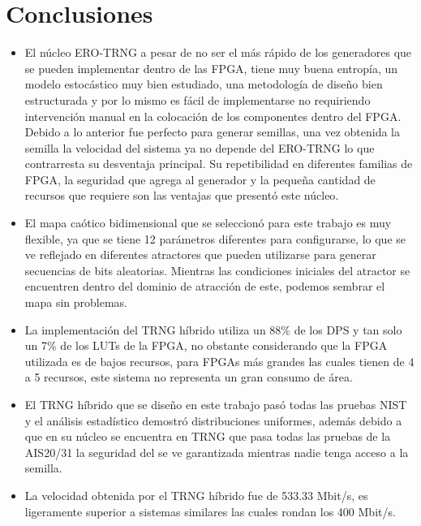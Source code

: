 \chapter{Conclusiones}

    \begin{itemize}
        \item El núcleo ERO-TRNG a pesar de no ser el más rápido de los generadores que se pueden implementar dentro de las FPGA, tiene muy buena entropía, un modelo estocástico muy bien estudiado, una metodología de diseño bien estructurada y por lo mismo es fácil de implementarse no requiriendo intervención manual en la colocación de los componentes dentro del FPGA. Debido a lo anterior fue perfecto para generar semillas, una vez obtenida la semilla la velocidad del sistema ya no depende del ERO-TRNG lo que contrarresta su desventaja principal. Su repetibilidad en diferentes familias de FPGA, la seguridad que agrega al generador y la pequeña cantidad de recursos que requiere son las ventajas que presentó este núcleo.

        \item El mapa caótico bidimensional que se seleccionó para este trabajo es muy flexible, ya que se tiene 12 parámetros diferentes para configurarse, lo que se ve reflejado en diferentes atractores que pueden utilizarse para generar secuencias de bits aleatorias. Mientras las condiciones iniciales del atractor se encuentren dentro del dominio de atracción de este, podemos sembrar el mapa sin problemas. 

        \item La implementación del TRNG híbrido utiliza un 88\% de los DPS y tan solo un 7\% de los LUTs de la FPGA, no obstante considerando que la FPGA utilizada es de bajos recursos, para FPGAs más grandes las cuales tienen de 4 a 5 recursos, este sistema no representa un gran consumo de área.

        \item El TRNG híbrido que se diseño en este trabajo pasó todas las pruebas NIST y el análisis estadístico demostró distribuciones uniformes, además debido a que en su núcleo se encuentra en TRNG que pasa todas las pruebas de la AIS20/31 la seguridad del se ve garantizada mientras nadie tenga acceso a la semilla.

        \item La velocidad obtenida por el TRNG híbrido fue de 533.33 Mbit/s, es ligeramente superior a sistemas similares las cuales rondan los 400 Mbit/s.

    \end{itemize}
    
